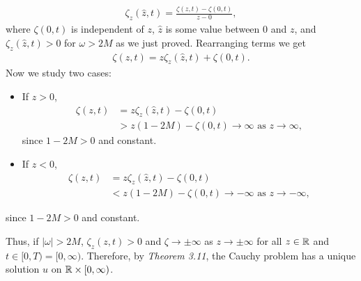 \begin{questions}
\begin{solution}
\begin{align*}
\zeta_z(\hat{z},t)=\frac{\zeta(z,t)-\zeta(0,t)}{z-0},
\end{align*}
where $\zeta(0,t)$ is independent of $z$, $\hat{z}$ is some value between $0$ and $z$, and $\zeta_z(\hat{z},t)>0$ for $\omega>2M$ as we just proved. Rearranging terms we get
\begin{align*}
\zeta(z,t)=z\zeta_z(\hat{z},t)+\zeta(0,t).
\end{align*}
Now we study two cases:
\begin{itemize}
\item If $z>0$,
\begin{align*}
\zeta(z,t)&=z\zeta_z(\hat{z},t)-\zeta(0,t)\\
&>z(1-2M)-\zeta(0,t)\rightarrow\infty\text{ as } z\rightarrow\infty,
\end{align*}
since $1-2M>0$ and constant.
\item If $z<0$,
\begin{align*}
\zeta(z,t)&=z\zeta_z(\hat{z},t)-\zeta(0,t)\\
&<z(1-2M)-\zeta(0,t)\rightarrow -\infty\text{ as } z\rightarrow -\infty,
\end{align*}
\end{itemize}
since $1-2M>0$ and constant. 

Thus, if $|\omega|>2M$, $\zeta_z(z,t)>0$ and $\zeta\rightarrow\pm\infty$ as $z\rightarrow\pm\infty$ for all $z\in\mathbb{R}$ and $t\in[0,T)=[0,\infty)$. Therefore, by \textsl{Theorem 3.11}, the Cauchy problem has a unique solution $u$ on $\mathbb{R}\times[0,\infty)$.


\end{solution}
\end{questions}
